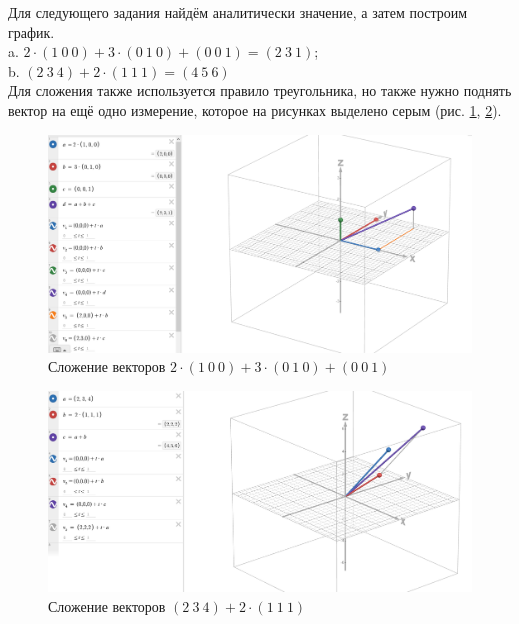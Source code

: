 \documentclass[14pt,a4paper]{extarticle}
\begin{document}
Для следующего задания найдём аналитически значение,
а затем построим график.\\
a. $2 \cdot (1 \ 0 \ 0) + 3 \cdot (0 \ 1 \ 0) + (0 \ 0 \ 1) = (2 \ 3 \ 1)$;\\
b.	$(2 \ 3 \ 4) + 2 \cdot (1 \ 1 \ 1) = (4 \ 5 \ 6)$\\
Для сложения также используется правило треугольника, но также нужно поднять
вектор на ещё одно измерение, которое на рисунках выделено серым (рис. \ref {pic:a2}, \ref {pic:b2}).
\begin{figure}[h!]
    \centering
    \includegraphics[scale=0.3]{pic7/5.3.a.png}
    \caption{Сложение векторов $2 \cdot (1 \ 0 \ 0) + 3 \cdot (0 \ 1 \ 0) + (0 \ 0 \ 1)$}
    \label{pic:a2}
\end{figure}
\FloatBarrier
\begin{figure}[h!]
    \centering
    \includegraphics[scale=0.3]{pic7/5.3.b.png}
    \caption{Сложение векторов $(2 \ 3 \ 4) + 2 \cdot (1 \ 1 \ 1)$}
    \label{pic:b2}
\end{figure}
\FloatBarrier
\end{document}
